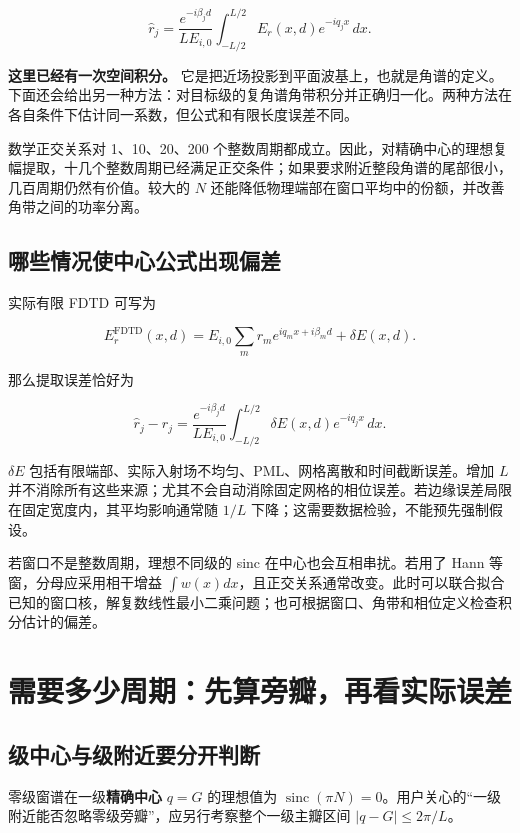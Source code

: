 \documentclass[
  chinese,
  UTF8,
  a4paper,
  11pt]{ctexart}
\begin{document}
\[\widehat r_j=\frac{e^{-i\beta_jd}}{L E_{i,0}}\int_{-L/2}^{L/2}E_r(x,d)e^{-iq_jx}\,dx.\]

\textbf{这里已经有一次空间积分。}
它是把近场投影到平面波基上，也就是角谱的定义。下面还会给出另一种方法：对目标级的复角谱角带积分并正确归一化。两种方法在各自条件下估计同一系数，但公式和有限长度误差不同。

数学正交关系对 1、10、20、200
个整数周期都成立。因此，对精确中心的理想复幅提取，十几个整数周期已经满足正交条件；如果要求附近整段角谱的尾部很小，几百周期仍然有价值。较大的
\(N\) 还能降低物理端部在窗口平均中的份额，并改善角带之间的功率分离。

\subsection{哪些情况使中心公式出现偏差}\label{ux54eaux4e9bux60c5ux51b5ux4f7fux4e2dux5fc3ux516cux5f0fux51faux73b0ux504fux5dee}

实际有限 FDTD 可写为

\[E_r^{\mathrm{FDTD}}(x,d)=E_{i,0}\sum_mr_m e^{iq_mx+i\beta_md}+\delta E(x,d).\]

那么提取误差恰好为

\[\widehat r_j-r_j=\frac{e^{-i\beta_jd}}{L E_{i,0}}\int_{-L/2}^{L/2}\delta E(x,d)e^{-iq_jx}\,dx.\]

\(\delta E\)
包括有限端部、实际入射场不均匀、PML、网格离散和时间截断误差。增加 \(L\)
并不消除所有这些来源；尤其不会自动消除固定网格的相位误差。若边缘误差局限在固定宽度内，其平均影响通常随
\(1/L\) 下降；这需要数据检验，不能预先强制假设。

若窗口不是整数周期，理想不同级的 sinc 在中心也会互相串扰。若用了 Hann
等窗，分母应采用相干增益
\(\int w(x)dx\)，且正交关系通常改变。此时可以联合拟合已知的窗口核，解复数线性最小二乘问题；也可根据窗口、角带和相位定义检查积分估计的偏差。

\section{需要多少周期：先算旁瓣，再看实际误差}\label{ux9700ux8981ux591aux5c11ux5468ux671fux5148ux7b97ux65c1ux74e3ux518dux770bux5b9eux9645ux8befux5dee}

\subsection{级中心与级附近要分开判断}\label{ux7ea7ux4e2dux5fc3ux4e0eux7ea7ux9644ux8fd1ux8981ux5206ux5f00ux5224ux65ad}

零级窗谱在一级\textbf{精确中心} \(q=G\) 的理想值为
\(\operatorname{sinc}(\pi N)=0\)。用户关心的``一级附近能否忽略零级旁瓣''，应另行考察整个一级主瓣区间
\(|q-G|\leq2\pi/L\)。
\end{document}
